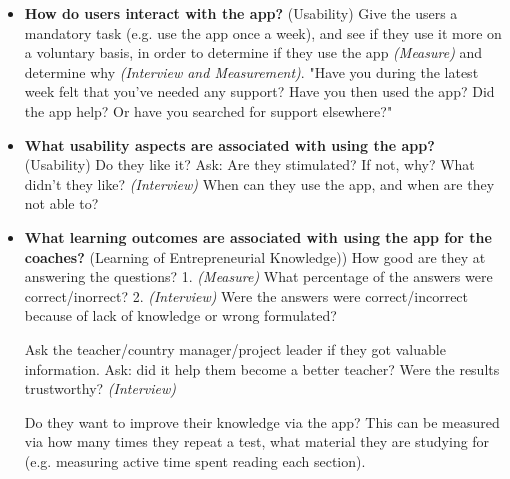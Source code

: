 \begin{itemize}
    \item 
    \textbf{How do users interact with the app?} (Usability) Give the users a mandatory task (e.g. use the app once a week), and see if they use it more on a voluntary basis, in order to determine if they use the app 
    \textit{(Measure)} and determine why \textit{(Interview and Measurement)}. "Have you during the latest week felt that you've needed any support? Have you then used the app? Did the app help? Or have you searched for support elsewhere?" 
\item \textbf{What usability aspects are associated with using the app?} (Usability) Do they like it? Ask: Are they stimulated? If not, why? What didn't they like? \textit{(Interview)} When can they use the app, and when are they not able to?
    
    \item \textbf{What learning outcomes are associated with using the app for the coaches?}  (Learning of Entrepreneurial Knowledge))
    How good are they at answering the questions? 1. 
    \textit{(Measure)} What percentage of the answers were correct/inorrect?  2. \textit{(Interview)} Were the answers were correct/incorrect because of lack of knowledge or wrong formulated?
    
    Ask the teacher/country manager/project leader if they got valuable information. Ask: did it help them become a better teacher? Were the results trustworthy? \textit{(Interview)}
    
    Do they want to improve their knowledge via the app? This can be measured via how many times they repeat a test, what material they are studying for (e.g. measuring active time spent reading each section).
\end{itemize}